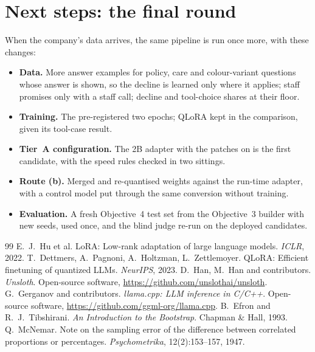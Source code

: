\documentclass[11pt,a4paper]{article}
\begin{document}
\section{Next steps: the final round}\label{sec:next}
When the company's data arrives, the same pipeline is run once more, with these changes:
\begin{itemize}
  \item \textbf{Data.} More answer examples for policy, care and colour-variant questions whose answer is shown, so the
        decline is learned only where it applies; staff promises only with a staff call; decline and tool-choice shares at
        their floor.
  \item \textbf{Training.} The pre-registered two epochs; QLoRA kept in the comparison, given its tool-case result.
  \item \textbf{Tier~A configuration.} The 2B adapter with the patches on is the first candidate, with the speed rules
        checked in two sittings.
  \item \textbf{Route (b).} Merged and re-quantised weights against the run-time adapter, with a control model put through
        the same conversion without training.
  \item \textbf{Evaluation.} A fresh Objective~4 test set from the Objective~3 builder with new seeds, used once, and the
        blind judge re-run on the deployed candidates.
\end{itemize}

\begin{thebibliography}{99}
 E.~J.~Hu et al. LoRA: Low-rank adaptation of large language models. \emph{ICLR}, 2022.
 T.~Dettmers, A.~Pagnoni, A.~Holtzman, L.~Zettlemoyer. QLoRA: Efficient finetuning of quantized LLMs.
  \emph{NeurIPS}, 2023.
 D.~Han, M.~Han and contributors. \emph{Unsloth}. Open-source software,
  \url{https://github.com/unslothai/unsloth}.
 G.~Gerganov and contributors. \emph{llama.cpp: LLM inference in C/C++}. Open-source software,
  \url{https://github.com/ggml-org/llama.cpp}.
 B.~Efron and R.~J.~Tibshirani. \emph{An Introduction to the Bootstrap}. Chapman \& Hall, 1993.
 Q.~McNemar. Note on the sampling error of the difference between correlated proportions or
  percentages. \emph{Psychometrika}, 12(2):153--157, 1947.
\end{thebibliography}

\appendix
\end{document}
